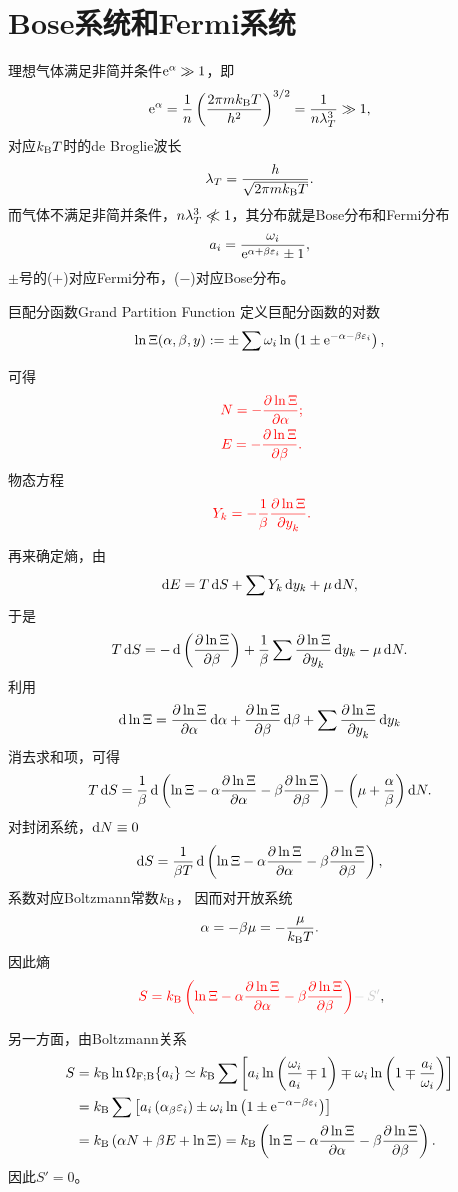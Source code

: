 \section{Bose系统和Fermi系统}
理想气体满足非简并条件$\mathop{}\!\mathrm{e}^\alpha\gg 1$，即
\[
	\mathop{}\!\mathrm{e}^\alpha=\frac1n\left(\frac{2\pi mk_{\mathrm B} T}{h^2}\right)^{3/2}=\frac1{n\lambda_T^3}\gg 1,
\]
对应$k_{\mathrm B} T$时的de Broglie波长
\begin{align}\label{T-deB}
	\lambda_T=\frac{h}{\sqrt{2\pi mk_{\mathrm B} T}}.
\end{align}
而气体不满足非简并条件，$n\lambda_T^3\ll\bs{10}/\enspace 1$，其分布就是Bose分布和Fermi分布%
\begin{align}
	a_i=\frac{\omega_i}{\mathop{}\!\mathrm{e}^{\alpha+\beta\varepsilon_i}\pm 1},
\end{align}
$\pm$号的($+$)对应Fermi分布，($-$)对应Bose分布。
\begin{definition}{巨配分函数}{Grand Partition Function}
	定义巨配分函数的对数
	\begin{align}
		\ln\Xi(\alpha,\beta,y):=\pm\sum\omega_i\ln\left(1\pm\mathop{}\!\mathrm{e}^{-\alpha-\beta\varepsilon_i}\right),
	\end{align}
\end{definition}
可得
\begin{gather}
	\spark{N=-\pv{\ln\Xi}{\alpha};}\\ %
	\spark{E=-\pv{\ln\Xi}{\beta}.}
\end{gather}
物态方程
\begin{align}
	\;\textcolor{red}{Y_k=-\frac1\beta\frac{\partial^{\;\!\!}\ln\Xi}{\partial y_k^{\;\!\!}}.}
\end{align}

再来确定熵，由
\[
	\mathop{}\!\mathrm{d} E=T\mathop{}\!\mathrm{d} S+\sum Y_k\mathop{}\!\mathrm{d} y_k+\mu\mathop{}\!\mathrm{d} N,
\]
于是
\[
	T\d S=-\d\kh{\pv{\ln\Xi}\beta}+\frac1\beta\sum\pv{\ln\Xi}{y_k}\d y_k-\mu\d N.
\]
利用
\[
	\d\ln\Xi=\pv{\ln\Xi}\alpha\d\alpha+\pv{\ln\Xi}\beta\d\beta+\sum\pv{\ln\Xi}{y_k}\d y_k
\]
消去求和项，可得
\[
	T\d S=\frac1\beta\d\kh{\ln\Xi-\alpha\pv{\ln\Xi}\alpha-\beta\pv{\ln\Xi}\beta}-\kh{\mu+\frac\alpha\beta}\d N.
\]
对封闭系统，$\mathop{}\!\mathrm{d} N\equiv 0$
\[
	\d S=\frac1{\beta T}\d\kh{\ln\Xi-\alpha\pv{\ln\Xi}\alpha-\beta\pv{\ln\Xi}\beta},
\]
系数对应Boltzmann常数$k_{\mathrm B}$，
因而对开放系统
\begin{align}\label{Bose-mu}
	\alpha=-\beta\mu=-\frac\mu{k_{\mathrm B} T}.
\end{align}
因此熵
\begin{align}
	\spark{S=\kB\kh{\ln\Xi-\alpha\pv{\ln\Xi}\alpha-\beta\pv{\ln\Xi}\beta}}{\color[gray]{.8}-\,S'},
\end{align}

另一方面，由Boltzmann关系
\begin{align*}
	S & =\kB\ln\Om[F;B]\simeq\kB\sum\fkh{a_i\ln\kh{\frac{\omega_i}{a_i}\mp 1}\mp\omega_i\ln\kh{1\mp\frac{a_i}{\omega_i}}} \\
	  & =\kB\sum\fkh{a_i\kh{\alpha_\beta\ve_i}\pm\omega_i\ln\kh{1\pm\e{-\alpha-\beta\ve_i}}}                             \\
	  & =\kB\kh{\alpha N+\beta E+\ln\Xi}=\kB\kh{\ln\Xi-\alpha\pv{\ln\Xi}\alpha-\beta\pv{\ln\Xi}\beta}.
\end{align*}
因此$S'=0$。
